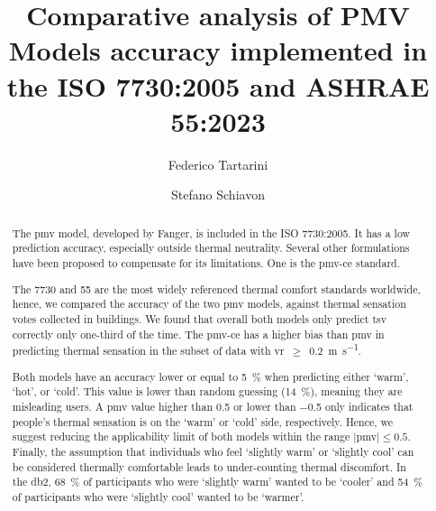 \begin{frontmatter}

    \title{Comparative analysis of PMV Models accuracy implemented in the ISO 7730:2005 and ASHRAE 55:2023}

    \author[label1]{Federico Tartarini}
    \author[label3]{Stefano Schiavon}

    \address[label1]{School of Architecture, Design, and Planning, The University of Sydney, Sydney, AU}
    \address[label3]{Center for the Built Environment, Department of Architecture, Department of Civil and Environmental Engineering, University of California, Berkeley, CA, USA}


    \begin{abstract}
        The \ac{pmv} model, developed by Fanger, is included in the ISO 7730:2005.
        It has a low prediction accuracy, especially outside thermal neutrality.
        Several other formulations have been proposed to compensate for its limitations.
        One is the \ac{pmv-ce} standard.

        The \gls{7730} and \gls{55} are the most widely referenced thermal comfort standards worldwide, hence, we compared the accuracy of the two \ac{pmv} models, against  thermal sensation votes collected in buildings.
        We found that overall both models only predict \ac{tsv} correctly only one-third of the time.
        The \ac{pmv-ce} has a higher bias than \ac{pmv} in predicting thermal sensation in the subset of data with \acl{vr}~$\geq$~\qty{0.2}{\m\per\s}.

        Both models have an accuracy lower or equal to \qty{5}{\percent} when predicting either `warm', `hot', or `cold'.
        This value is lower than random guessing (\qty{14}{\percent}), meaning they are misleading users.
        A \ac{pmv} value higher than \num{.5} or lower than \num{-.5} only indicates that people's thermal sensation is on the `warm' or `cold' side, respectively.
        Hence, we suggest reducing the applicability limit of both models within the range $\mid$\ac{pmv}$\mid \leq 0.5$.
        Finally, the assumption that individuals who feel `slightly warm' or `slightly cool' can be considered thermally comfortable leads to under-counting thermal discomfort.
        In the \acl{db2}, \qty{68}{\percent} of participants who were `slightly warm' wanted to be `cooler' and \qty{54}{\percent} of participants who were `slightly cool' wanted to be `warmer'.
    \end{abstract}


\end{frontmatter}
